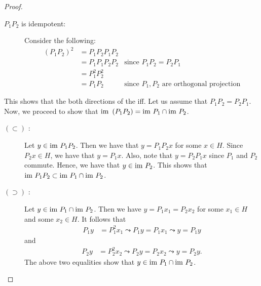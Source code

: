 \begin{proof}
\begin{description}
	\item[$P_{1} P_{2}$ is idempotent:] Consider the following:
	    \begin{align*}
		(P_{1} P_{2})^{2} &= P_{1} P_{2} P_{1} P_{2} \\
		&= P_{1} P_{1} P_{2} P_{2} & \text{since } P_{1} P_{2} = P_{2} P_{1} \\
		&= P_{1}^{2} P_{2}^{2} \\
		&= P_{1} P_{2} & \text{since } P_{1}, P_{2} \text{ are orthogonal projection}
	    \end{align*}
    \end{description}
    This shows that the both directions of the iff.
    Let us assume that $P_{1}P_{2}=P_{2}P_{1}$. Now, we proceed to show that ${\text{im }} \left( P_{1} P_{2} \right) = {\text{im }} P_{1} \cap {\text{im }} P_{2}$. 
    \begin{description}
	\item[$(\subset)$ :] Let $y \in {\text{im }} P_{1}P_{2}$. Then we have that $y=P_{1}P_{2} x$ for some $x\in H$. Since $P_{2}x \in H$, we have that $y=P_{1}x$. Also, note that $y=P_{2}P_{1}x$ since $P_{1}$ and $P_2$ commute. Hence, we have that $y\in {\text{im }} P_{2}$. This shows that ${\text{im }} P_{1}P_{2} \subset {\text{im }} P_{1} \cap {\text{im }} P_{2}$.
	\item[$(\supset)$ :] Let $y\in {\text{im }} P_{1} \cap {\text{im }} P_{2}$. Then we have $y=P_{1}x_{1}=P_{2}x_{2}$ for some $x_{1} \in H$ and some $x_{2} \in H$. It follows that
	    \begin{align*}
		P_{1}y &=P_{1}^{2} x_{1} \leadsto P_{1}y = P_{1}x_{1} \leadsto y= P_{1}y
	    \end{align*}
	    and
\begin{align*}
    P_{2}y &=P_{2}^{2} x_{2} \leadsto P_{2}y = P_{2}x_{2} \leadsto y= P_{2}y.
	    \end{align*}
	    The above two equalities show that $y\in {\text{im }} P_{1} \cap {\text{im }} P_{2}$.
    \end{description}
\end{proof}

